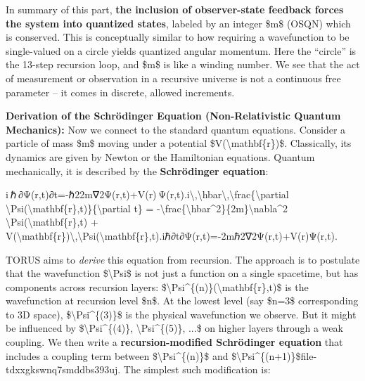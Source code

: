 \documentclass[
]{article}
\begin{document}
In summary of this part, \textbf{the inclusion of observer-state
feedback forces the system into quantized states}, labeled by an integer
\$m\$ (OSQN) which is conserved. This is conceptually similar to how
requiring a wavefunction to be single-valued on a circle yields
quantized angular momentum. Here the ``circle'' is the 13-step recursion
loop, and \$m\$ is like a winding number\hspace{0pt}. We see that the
act of measurement or observation in a recursive universe is not a
continuous free parameter -- it comes in discrete, allowed increments.

\textbf{Derivation of the Schrödinger Equation (Non-Relativistic Quantum
Mechanics):} Now we connect to the standard quantum equations. Consider
a particle of mass \$m\$ moving under a potential
\$V(\textbackslash mathbf\{r\})\$. Classically, its dynamics are given
by Newton or the Hamiltonian equations. Quantum mechanically, it is
described by the \textbf{Schrödinger equation}:

i ℏ ∂Ψ(r,t)∂t=-ℏ22m∇2Ψ(r,t)+V(r) Ψ(r,t).i\textbackslash,\textbackslash hbar\textbackslash,\textbackslash frac\{\textbackslash partial
\textbackslash Psi(\textbackslash mathbf\{r\},t)\}\{\textbackslash partial
t\} =
-\textbackslash frac\{\textbackslash hbar\^{}2\}\{2m\}\textbackslash nabla\^{}2
\textbackslash Psi(\textbackslash mathbf\{r\},t) +
V(\textbackslash mathbf\{r\})\textbackslash,\textbackslash Psi(\textbackslash mathbf\{r\},t).iℏ∂t∂Ψ(r,t)\hspace{0pt}=-2mℏ2\hspace{0pt}∇2Ψ(r,t)+V(r)Ψ(r,t).

TORUS aims to \emph{derive} this equation from recursion. The approach
is to postulate that the wavefunction \$\textbackslash Psi\$ is not just
a function on a single spacetime, but has components across recursion
layers: \$\textbackslash Psi\^{}\{(n)\}(\textbackslash mathbf\{r\},t)\$
is the wavefunction at recursion level \$n\$. At the lowest level (say
\$n=3\$ corresponding to 3D space), \$\textbackslash Psi\^{}\{(3)\}\$ is
the physical wavefunction we observe. But it might be influenced by
\$\textbackslash Psi\^{}\{(4)\}, \textbackslash Psi\^{}\{(5)\}, ...\$ on
higher layers through a weak coupling. We then write a
\textbf{recursion-modified Schrödinger equation} that includes a
coupling term between \$\textbackslash Psi\^{}\{(n)\}\$ and
\$\textbackslash Psi\^{}\{(n+1)\}\$\hspace{0pt}file-tdxxgkswnq7smddbs393uj.
The simplest such modification is:
\end{document}
